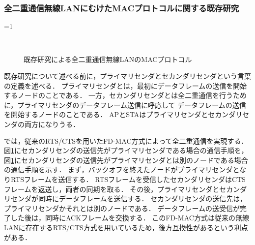 \documentclass[master]{kuisthesis}		%
\newcounter{flagFig}
\begin{document}
		\subsubsection{全二重通信無線LANにむけたMACプロトコルに関する既存研究}\label{sec:mac_problem}

			\ifnum\value{flagFig}=1 {\begin{figure}[htbp]
				\begin{center}
						\\
						\caption{既存研究\cite{fdmac}による全二重通信無線LANのMACプロトコル}
						\label{fig:fdmac_protocol}
				\end{center}
			\end{figure}}\fi

			既存研究について述べる前に，プライマリセンダとセカンダリセンダという言葉の定義を述べる．
			プライマリセンダとは，最初にデータフレームの送信を開始するノードのことである．
			一方，セカンダリセンダとは全二重通信を行うために，プライマリセンダのデータフレーム送信に呼応して
			データフレームの送信を開始するノードのことである．
			APとSTAはプライマリセンダとセカンダリセンダの両方になりうる．
			\par
			\cite{fdmac}では，従来のRTS/CTSを用いたFD-MAC方式によって全二重通信を実現する．
			図\ref{fig:fdmac_protocol}にセカンダリセンダの送信先がプライマリセンダである場合の通信手順を，
			図\ref{fig:fdmac_protocol}にセカンダリセンダの送信先がプライマリセンダとは別のノードである場合の通信手順を示す．
			まず，バックオフを終えたノードがプライマリセンダとなりRTSフレームを送信する．
			RTSフレームを受信したセカンダリセンダはCTSフレームを返送し，両者の同期を取る．
			その後，プライマリセンダとセカンダリセンダが同時にデータフレームを送信する．
			セカンダリセンダの送信先は，プライマリセンダかそれとは別のノードである．
			データフレームの送受信が完了した後は，同時にACKフレームを交換する．
			このFD-MAC方式は従来の無線LANに存在するRTS/CTS方式を用いているため，後方互換性があるという利点がある．
\end{document}
